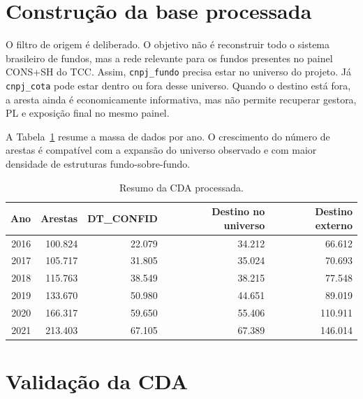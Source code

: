 \documentclass[12pt,a4paper]{report}
\begin{document}
\section{Construção da base processada}

O filtro de origem é deliberado. O objetivo não é reconstruir todo o sistema brasileiro de fundos, mas a
rede relevante para os fundos presentes no painel CONS+SH do TCC. Assim, \texttt{cnpj\_fundo} precisa estar
no universo do projeto. Já \texttt{cnpj\_cota} pode estar dentro ou fora desse universo. Quando o destino
está fora, a aresta ainda é economicamente informativa, mas não permite recuperar gestora, PL e exposição
final no mesmo painel.

A Tabela~\ref{tab:cdaresumo} resume a massa de dados por ano. O crescimento do número de arestas é
compatível com a expansão do universo observado e com maior densidade de estruturas fundo-sobre-fundo.

\begin{table}[H]\centering
\caption{Resumo da CDA processada.}
\label{tab:cdaresumo}
\small
\begin{tabular}{rrrrr}
\toprule
\textbf{Ano} & \textbf{Arestas} & \textbf{DT\_CONFID} & \textbf{Destino no universo} & \textbf{Destino externo} \\
\midrule
2016 & 100.824 & 22.079 & 34.212 & 66.612 \\
2017 & 105.717 & 31.805 & 35.024 & 70.693 \\
2018 & 115.763 & 38.549 & 38.215 & 77.548 \\
2019 & 133.670 & 50.980 & 44.651 & 89.019 \\
2020 & 166.317 & 59.650 & 55.406 & 110.911 \\
2021 & 213.403 & 67.105 & 67.389 & 146.014 \\
\bottomrule
\end{tabular}
\end{table}

\section{Validação da CDA}
\end{document}
